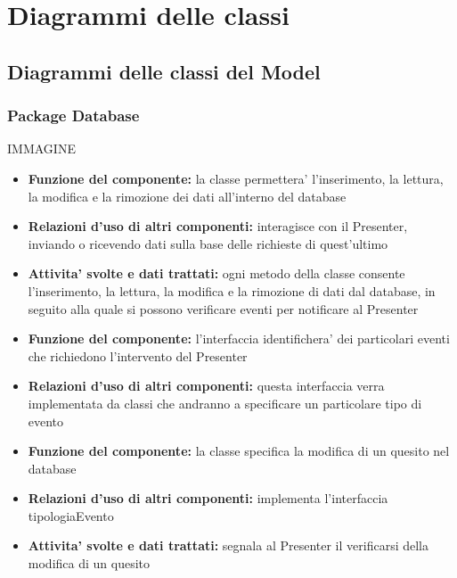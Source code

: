 \documentclass[a4paper,11pt]{article}
\begin{document}
	\section{Diagrammi delle classi}
		\subsection{Diagrammi delle classi del Model}
			\subsubsection{Package Database}
			IMMAGINE
 			\begin{itemize}
		    	\item\textbf{Funzione del componente:} la classe permettera' l'inserimento, la lettura, la modifica e la rimozione dei dati all'interno del database
			\item\textbf{Relazioni d'uso di altri componenti:} interagisce con il Presenter, inviando o ricevendo dati sulla base delle richieste di quest'ultimo
			\item\textbf{Attivita' svolte e dati trattati:} ogni metodo della classe consente l'inserimento, la lettura, la modifica e la rimozione di dati dal database, in seguito alla quale si possono verificare eventi per notificare al Presenter
			\end{itemize}
			\begin{itemize}
		    	\item\textbf{Funzione del componente:} l'interfaccia identifichera' dei particolari eventi che richiedono l'intervento del Presenter
			\item\textbf{Relazioni d'uso di altri componenti:} questa interfaccia verra implementata da classi che andranno a specificare un particolare tipo di evento
			\end{itemize}
			\begin{itemize}
		    	\item\textbf{Funzione del componente:} la classe specifica la modifica di un quesito nel database
				\item\textbf{Relazioni d'uso di altri componenti:} implementa l'interfaccia tipologiaEvento
				\item\textbf{Attivita' svolte e dati trattati:} segnala al Presenter il verificarsi della modifica di un quesito
			\end{itemize}
\end{document}
